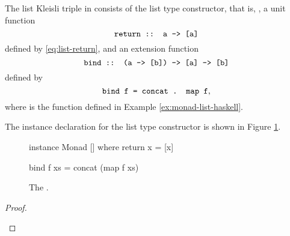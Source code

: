 \begin{example}
  \label{ex:triple-list-haskell}

  The list Kleisli triple in \hask consists of the list type
  constructor, that is, \texthaskell{[]}, a unit function
  \begin{equation*}
    \text{\texttt{return :: a -> [a]}}
  \end{equation*}
  defined by \eqref{eq:list-return}, and an extension function
  \begin{equation*}
    \text{\texttt{bind :: (a -> [b]) -> [a] -> [b]}}
  \end{equation*}
  defined by
  \begin{equation}
    \label{eq:list-bind}
    \text{\texttt{bind f = concat . map f}}
    \text{,}
  \end{equation}
  where  is the function defined in Example
  \ref{ex:monad-list-haskell}.

  The instance declaration for the list type constructor is shown in
  Figure \ref{fig:triple-list-haskell}.

  \begin{figure}[htbp]
    \begin{codehaskell}
instance Monad [] where
  return x = [x]

  bind f xs = concat (map f xs)
    \end{codehaskell}
    \caption{The \texthaskell{[]} .}
    \label{fig:triple-list-haskell}
  \end{figure}

  \begin{proof}
    \hfill
    \begin{steps}
      \steph{[]}
    \end{steps}

    \begin{steps}
        \eqbyih
        \eqbydefh{(++)}
    \end{steps}
  \end{proof}
\end{example}


